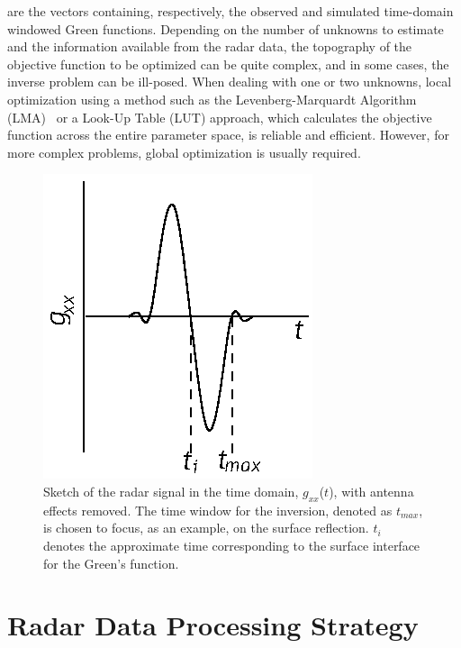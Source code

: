 are the vectors containing, respectively, the observed and simulated
time-domain windowed Green functions. Depending on the number of unknowns to estimate and the information available from the radar data, the topography of the objective function to be optimized can be quite complex, and in some cases, the inverse problem can be ill-posed. When dealing with one or two unknowns, local optimization using a method such as the Levenberg-Marquardt Algorithm (LMA)~\cite{Marquardt:1963} or a Look-Up Table (LUT) approach, which calculates the objective function across the entire parameter space, is reliable and efficient. However, for more complex problems, global optimization is usually required. 

\begin{figure}[t]
\noindent \centering

\includegraphics[width=0.4\columnwidth,trim={0 0 0 0.6cm},clip]{Figures/RadarChallenges/Theory/twr.eps}
\vspace{-4pt}
\caption{Sketch of the radar signal in the time domain, $g_{xx}$($t$), with antenna effects removed. The time window for the inversion, denoted as $t_{max}$, is chosen to focus, as an example, on the surface reflection. $t_i$ denotes the approximate time corresponding to the surface interface for the Green's function.} 
\label{fig:radar-challenges:tw}
\vspace{-12pt}
\end{figure}


\section{Radar Data Processing Strategy} \label{sec:radar-challenges:processing-strategy}

